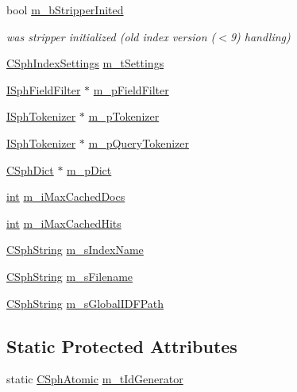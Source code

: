 \begin{DoxyCompactItemize}
\item 
bool \hyperlink{classCSphIndex_a43b4e8669a77db805d1d30d0325e6794}{m\-\_\-b\-Stripper\-Inited}
\begin{DoxyCompactList}\small\item\em was stripper initialized (old index version ($<$9) handling) \end{DoxyCompactList}\item 
\hyperlink{structCSphIndexSettings}{C\-Sph\-Index\-Settings} \hyperlink{classCSphIndex_a59dedae41c574242e5e79d0374ed19fe}{m\-\_\-t\-Settings}
\item 
\hyperlink{classISphFieldFilter}{I\-Sph\-Field\-Filter} $\ast$ \hyperlink{classCSphIndex_a3a9b6785cd9c40758e5c1f825fd6616a}{m\-\_\-p\-Field\-Filter}
\item 
\hyperlink{classISphTokenizer}{I\-Sph\-Tokenizer} $\ast$ \hyperlink{classCSphIndex_ae220d1ce0b1053820df97afbf2683dbe}{m\-\_\-p\-Tokenizer}
\item 
\hyperlink{classISphTokenizer}{I\-Sph\-Tokenizer} $\ast$ \hyperlink{classCSphIndex_a177bf9dacaba3e12908320912db7179b}{m\-\_\-p\-Query\-Tokenizer}
\item 
\hyperlink{classCSphDict}{C\-Sph\-Dict} $\ast$ \hyperlink{classCSphIndex_a5fa18188166d442d8c9e0928bc59d4a2}{m\-\_\-p\-Dict}
\item 
\hyperlink{sphinxexpr_8cpp_a4a26e8f9cb8b736e0c4cbf4d16de985e}{int} \hyperlink{classCSphIndex_a99d4477ac2e55b526c74babdd8d27dd2}{m\-\_\-i\-Max\-Cached\-Docs}
\item 
\hyperlink{sphinxexpr_8cpp_a4a26e8f9cb8b736e0c4cbf4d16de985e}{int} \hyperlink{classCSphIndex_a011ae8fbba68bc25a6e3e56d0edbe159}{m\-\_\-i\-Max\-Cached\-Hits}
\item 
\hyperlink{structCSphString}{C\-Sph\-String} \hyperlink{classCSphIndex_a07ed79f3e08ce83af0e577adf39b6cbe}{m\-\_\-s\-Index\-Name}
\item 
\hyperlink{structCSphString}{C\-Sph\-String} \hyperlink{classCSphIndex_adebe47fc8d23793a31eb11f6fe5e78df}{m\-\_\-s\-Filename}
\item 
\hyperlink{structCSphString}{C\-Sph\-String} \hyperlink{classCSphIndex_a856776628b64efdc682a721bf8b56671}{m\-\_\-s\-Global\-I\-D\-F\-Path}
\end{DoxyCompactItemize}
\subsection*{Static Protected Attributes}
\begin{DoxyCompactItemize}
\item 
static \hyperlink{sphinxstd_8h_a9699401fcfba9f39dfa1838a3af04fe2}{C\-Sph\-Atomic} \hyperlink{classCSphIndex_a331d31cbb0391b8ca783401d00f89141}{m\-\_\-t\-Id\-Generator}
\end{DoxyCompactItemize}


